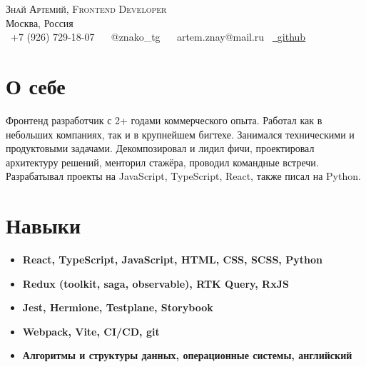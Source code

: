 \documentclass[letterpaper,12pt]{article}
\newcommand{\resumeSubHeadingListStart}{\begin{itemize}[leftmargin=*]}
\newcommand{\resumeSubHeadingListEnd}{\end{itemize}}
\begin{document}
\begin{center}
    {\huge \scshape Знай Артемий, Frontend Developer}
    \\ \vspace{1pt}
    Москва, Россия 
    \\ \vspace{6pt}
    \small \raisebox{-0.1\height}\faPhone\ +7 (926) 729-18-07 ~ 
    \raisebox{-0.1\height}\faPaperPlane\ {@znako\_tg} ~ 
    \raisebox{-0.1\height}\faEnvelope\  artem.znay@mail.ru~ 
    \href{https://github.com/znako}{\raisebox{-0.2\height}\faGithub\ \underline{github}} ~
    \vspace{-8pt}
\end{center}

\vspace{4pt}

\section{О себе}
    Фронтенд разработчик с 2+ годами коммерческого опыта. Работал как в небольших компаниях, так и в крупнейшем бигтехе. Занимался техническими и продуктовыми задачами. Декомпозировал и лидил фичи, проектировал архитектуру решений,  менторил стажёра, проводил командные встречи. Разрабатывал проекты на JavaScript, TypeScript, React, также писал на Python.

\vspace{4pt}

\section{Навыки}
 \resumeSubHeadingListStart
   \item{
     \textbf{\textbf{React, TypeScript, JavaScript, HTML, CSS, SCSS, Python} }
   }\vspace{-7pt}
   \item{
     \textbf{\textbf{Redux (toolkit, saga, observable), RTK Query, RxJS} }
   }\vspace{-7pt}
   \item{
     \textbf{Jest, Hermione, Testplane, Storybook}
   }\vspace{-7pt}
   \item{
     \textbf{Webpack, Vite, CI/CD, git}
   }\vspace{-7pt}
   \item{
     \textbf{Алгоритмы и структуры данных, операционные системы, английский}
   }
 \resumeSubHeadingListEnd
\end{document}
